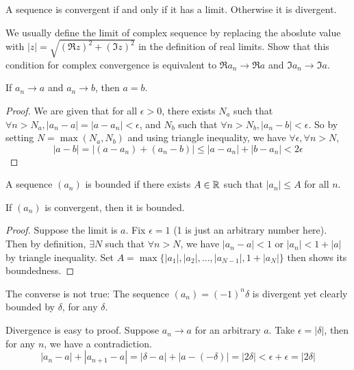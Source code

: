 \documentclass[11pt]{article}
\begin{document}
\begin{definition}[Convergence]
  A sequence is convergent if and only if it has a limit. Otherwise it is divergent.
\end{definition}

\begin{exercise}
  We usually define the limit of complex sequence by replacing the aboslute value with \(|z|=\sqrt{(\Re z)^2+(\Im z)^2}\) in the definition of real limits. Show that this condition for complex convergence is equivalent to \(\Re a_n\to\Re a\) and \(\Im a_n\to\Im a\).
\end{exercise}

\begin{theorem}
  If \(a_n\to a\) and \(a_n\to b\), then \(a=b\).
\end{theorem}
\begin{proof}
  We are given that for all \(\epsilon>0\), there exists \(N_a\) such that \(\forall n>N_a,|a_n-a|=|a-a_n|<\epsilon\), and \(N_b\) such that \(\forall n>N_b,|a_n-b|<\epsilon\). So by setting \(N=\max(N_a,N_b)\) and using triangle inequality, we have \(\forall \epsilon,\forall n>N\), 
  \[|a-b|=|(a-a_n)+(a_n-b)|\leq|a-a_n|+|b-a_n|<2\epsilon\]
\end{proof}

\begin{definition}[Boundedness]
  A sequence \((a_n)\) is bounded if there exists \(A\in\mathbb{R}\) such that \(|a_n|\leq A\) for all \(n\).
\end{definition}

\begin{proposition}
  If \((a_n)\) is convergent, then it is bounded.
\end{proposition}
\begin{proof}
  Suppose the limit is \(a\). Fix \(\epsilon=1\) (1 is just an arbitrary number here). Then by definition, \(\exists N\) such that \(\forall n>N\), we have \(|a_n-a|<1\) or \(|a_n|<1+|a|\) by triangle inequality. Set \(A=\max\{|a_1|,|a_2|,...,|a_{N-1}|,1+|a_N|\}\) then shows its boundedness.
\end{proof}
\begin{example}
  The converse is not true: The sequence \((a_n)=(-1)^n\delta\) is divergent yet clearly bounded by \(\delta\), for any \(\delta\).

  Divergence is easy to proof. Suppose \(a_n\to a\) for an arbitrary \(a\). Take \(\epsilon=|\delta|\), then for any \(n\), we have a contradiction.
  \[|a_n-a|+|a_{n+1}-a|=|\delta-a|+|a-(-\delta)|=|2\delta|<\epsilon+\epsilon=|2\delta|\]
\end{example}
\end{document}
